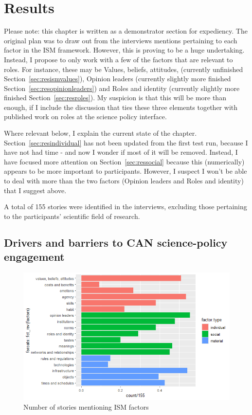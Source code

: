 \chapter{Results}\label{ch:results}

Please note: this chapter is written as a demonstrator section for expediency. The original plan was to draw out from the interviews mentions pertaining to each factor in the ISM framework. However, this is proving to be a huge undertaking. Instead, I propose to only work with a few of the factors that are relevant to roles. For instance, these may be Values, beliefs, attitudes, (currently unfinished Section~\ref{sec:resismvalues}), Opinion leaders (currently slightly more finished Section~\ref{sec:resopinionleaders}) and Roles and identity (currently slightly more finished Section~\ref{sec:resroles}). My suspicion is that this will be more than enough, if I include the discussion that ties these three elements together with published work on roles at the science policy interface.

Where relevant below, I explain the current state of the chapter. Section~\ref{sec:resindividual} has not been updated from the first test run, because I have not had time - and now I wonder if most of it will be removed. Instead, I have focused more attention on Section~\ref{sec:ressocial} because this (numerically) appears to be more important to participants. However, I suspect I won't be able to deal with more than the two factors (Opinion leaders and Roles and identity) that I suggest above.

A total of 155 stories were identified in the interviews, excluding those pertaining to the participants' scientific field of research.

\section{Drivers and barriers to CAN science-policy engagement}\label{sec:resultsISM}

\begin{figure}[!ht]
    \centering
    \includegraphics[width=1\linewidth]{figures/ism_count_per_story.png}
    \caption{Number of stories mentioning ISM factors}
    \label{fig:ismstorycount}
\end{figure}

